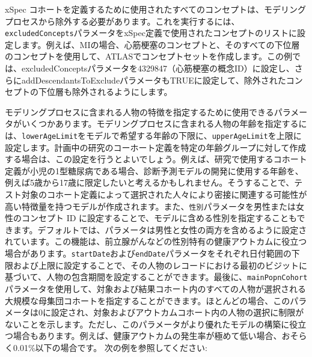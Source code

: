 \documentclass[
  11pt]{book}
\theoremstyle{definition}
\theoremstyle{definition}
\theoremstyle{definition}
\theoremstyle{definition}
\theoremstyle{remark}
\begin{document}
xSpec コホートを定義するために使用されたすべてのコンセプトは、モデリングプロセスから除外する必要があります。これを実行するには、\texttt{excludedConcepts}パラメータをxSpec定義で使用されたコンセプトのリストに設定します。例えば、MIの場合、心筋梗塞のコンセプトと、そのすべての下位層のコンセプトを使用して、ATLASでコンセプトセットを作成します。この例では、excludedConceptsパラメータを4329847（心筋梗塞の概念ID）に設定し、さらにaddDescendantsToExcludeパラメータもTRUEに設定して、除外されたコンセプトの下位層も除外されるようにします。

モデリングプロセスに含まれる人物の特徴を指定するために使用できるパラメータがいくつかあります。モデリングプロセスに含まれる人物の年齢を指定するには、\texttt{lowerAgeLimit}をモデルで希望する年齢の下限に、\texttt{upperAgeLimit}を上限に設定します。計画中の研究のコーホート定義を特定の年齢グループに対して作成する場合は、この設定を行うとよいでしょう。例えば、研究で使用するコホート定義が小児の1型糖尿病である場合、診断予測モデルの開発に使用する年齢を、例えば5歳から17歳に限定したいと考えるかもしれません。そうすることで、テスト対象のコホート定義によって選択された人々により密接に関連する可能性が高い特徴量を持つモデルが作成されます。また、\texttt{性別}パラメータを男性または女性のコンセプト ID に設定することで、モデルに含める性別を指定することもできます。デフォルトでは、パラメータは男性と女性の両方を含めるように設定されています。この機能は、前立腺がんなどの性別特有の健康アウトカムに役立つ場合があります。\texttt{startDate}および\texttt{endDate}パラメータをそれぞれ日付範囲の下限および上限に設定することで、その人物のレコードにおける最初のビジットに基づいて、人物の包含期間を設定することができます。最後に、\texttt{mainPopnCohort}パラメータを使用して、対象および結果コホート内のすべての人物が選択される大規模な母集団コホートを指定することができます。ほとんどの場合、このパラメータは0に設定され、対象およびアウトカムコホート内の人物の選択に制限がないことを示します。ただし、このパラメータがより優れたモデルの構築に役立つ場合もあります。例えば、健康アウトカムの発生率が極めて低い場合、おそらく0.01\%以下の場合です。 次の例を参照してください:
\end{document}
